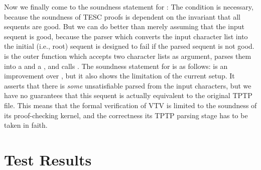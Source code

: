 \documentclass[12pt]{article}
\begin{document}
Now we finally come to the soundness statement for :
The condition \AgdaSpace{} is necessary, because 
the soundness of TESC proofs is dependent on the invariant that all sequents are good. 
But we can do better than merely assuming that the input sequent is good,
because the parser which converts the input character list into the initial (i.e., root) 
sequent is designed to fail if the parsed sequent is not good. 
is the outer function which accepts two character lists as argument, parses them 
into a  and a , and calls .
The soundness statement for  is as follows:
 is an improvement over ,
but it also shows the limitation of the current setup. It asserts that there is 
\textit{some} unsatisfiable  parsed from the input characters, 
but we have no guarantees that this sequent is actually equivalent to the original
TPTP file. This means that the formal verification of VTV is limited to the soundness 
of its proof-checking kernel, and the correctness its TPTP parsing stage has to be 
taken in faith.



\section{Test Results} \label{sec:test-results}
\end{document}
